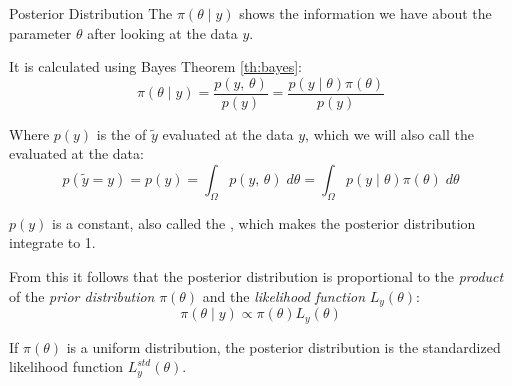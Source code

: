 \begin{definition}{Posterior Distribution}{}{}
    The  $\pi(\theta \mid y)$ shows the information we have
	about the parameter $\theta$ after looking at the data $y$.

	It is calculated using Bayes Theorem \ref{th:bayes}:
	\begin{equation}
		\pi(\theta \mid y) = \frac{p(y,\,\theta)}{p(y)} = \frac{p(y \mid \theta) \pi(\theta)}{p(y)}
	\end{equation}

	Where $p(y)$ is the  of $\tilde{y}$ evaluated at the
	data $y$, which we will also call the  evaluated at
	the data:
	\begin{equation}
		p(\tilde y = y) = p(y) = \int_{\Omega} p(y,\,\theta) \;d\theta = \int_{\Omega} p(y \mid \theta) \pi(\theta) \;d\theta
	\end{equation}

	\begin{note}
		$p(y)$ is a constant, also called the , which
		makes the posterior distribution integrate to 1.
	\end{note}

	From this it follows that the posterior distribution is proportional to the
	\emph{product} of the \emph{prior distribution} $\pi(\theta)$ and the
	\emph{likelihood function} $L_y(\theta)$:
	\begin{equation}
		\pi(\theta \mid y) \propto \pi(\theta) L_y(\theta)
	\end{equation}
\end{definition}

\begin{note}
	If $\pi(\theta)$ is a uniform distribution, the posterior distribution is the
	standardized likelihood function $L_y^{std}(\theta)$.
\end{note}

